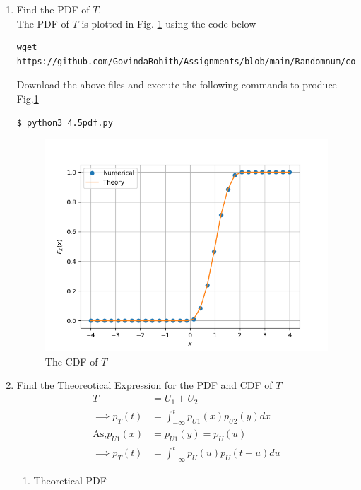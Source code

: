 \documentclass[journal,12pt,twocolumn]{IEEEtran}
\renewcommand\thesection{\arabic{section}}
\begin{document}
\begin{enumerate}[label=\thesection.\arabic*
,ref=\thesection.\theenumi]
\begin{figure}[!h]
\caption{The CDF of $T$}
\label{fig:4.2}
\end{figure}
\item Find the PDF of $T$.\\
\solution The PDF of $T$ is plotted in Fig. \ref{fig:4.2} using the code below
\begin{lstlisting}
wget https://github.com/GovindaRohith/Assignments/blob/main/Randomnum/codes/4.5pdf.py
\end{lstlisting}
Download the above files and execute the following commands to produce Fig.\ref{fig:4.2}
\begin{lstlisting}
$ python3 4.5pdf.py
\end{lstlisting}
\begin{figure}[!h]
\centering
\includegraphics[width=\columnwidth]{./figs/4.5cdf.png}
\caption{The CDF of $T$}
\label{fig:4.3}
\end{figure}
\item Find the Theoreotical Expression for the PDF and CDF of $T$\\
\solution
\begin{align}
    T&=U_1+U_2\\
    \implies p_T(t)&=\int_{-\infty}^{t}p_{U1}(x)p_{U2}(y)dx\\
    \text{As,}p_{U1}(x)&=p_{U1}(y)=p_{U}(u)\\
    \implies p_T(t)&=\int_{-\infty}^{t}p_{U}(u)p_{U}(t-u)du
    \end{align}
    \begin{enumerate}
        \item Theoretical PDF 
        \begin{enumerate}

\end{enumerate}
\end{enumerate}
\end{enumerate}
\end{document}
